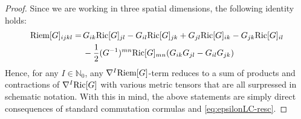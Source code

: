\documentclass[11pt,leqno,textwidth=10cm]{amsart}
\numberwithin{equation}{section}
\theoremstyle{definition}
\theoremstyle{plain}
\newcommand{\1}{\mathbbm{1}}
\newcommand{\N}{\mathbb{N}}
\newcommand{\Ric}{\text{\normalfont{Ric}}}
\newcommand{\Riem}{\text{\normalfont{Riem}}}
\begin{document}
\begin{proof}
Since we are working in three spatial dimensions, the following identity holds:
\begin{align*}
\Riem[G]_{ijkl}=&\,G_{ik}\Ric[G]_{jl}-G_{il}\Ric[G]_{jk}+G_{jl}\Ric[G]_{ik}-G_{jk}\Ric[G]_{il}\\
&\,-\frac12 (G^{-1})^{mn}\Ric[G]_{mn}(G_{ik}G_{jl}-G_{il}G_{jk})
\end{align*}
Hence, for any $I\in\N_0$, any $\nabla^I\Riem[G]$-term reduces to a sum of products and contractions of $\nabla^I\Ric[G]$ with various metric tensors that are all surpressed in schematic notation. With this in mind, the above statements are simply direct consequences of standard commutation cormulas and \eqref{eq:epsilonLC-resc}. 
\end{proof}
\end{document}

